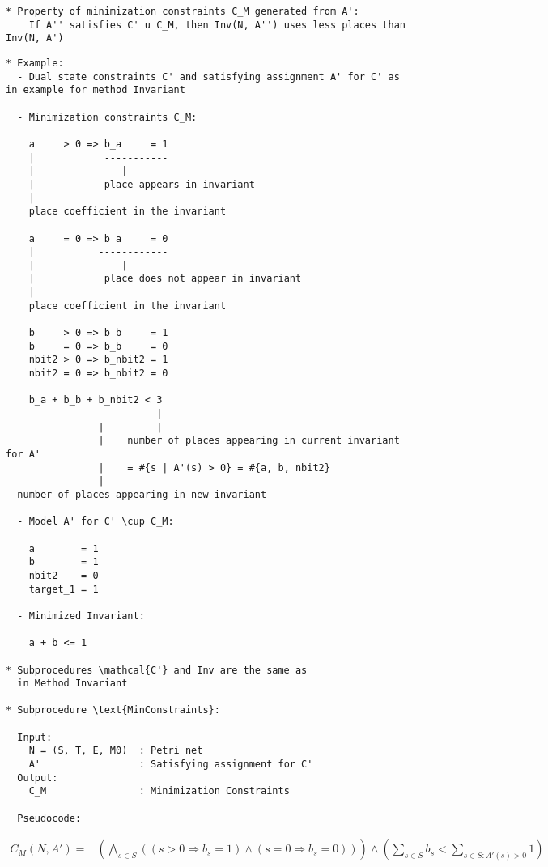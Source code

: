 \documentclass{llncs}
\begin{document}
\begin{verbatim}
* Property of minimization constraints C_M generated from A': 
    If A'' satisfies C' u C_M, then Inv(N, A'') uses less places than Inv(N, A')
\end{verbatim}

\newpage
\begin{verbatim}
* Example:
  - Dual state constraints C' and satisfying assignment A' for C' as in example for method Invariant

  - Minimization constraints C_M:

    a     > 0 => b_a     = 1
    |            -----------
    |               |
    |            place appears in invariant
    |
    place coefficient in the invariant

    a     = 0 => b_a     = 0
    |           ------------
    |               |
    |            place does not appear in invariant
    |
    place coefficient in the invariant

    b     > 0 => b_b     = 1
    b     = 0 => b_b     = 0
    nbit2 > 0 => b_nbit2 = 1
    nbit2 = 0 => b_nbit2 = 0

    b_a + b_b + b_nbit2 < 3
    -------------------   |
                |         |
                |    number of places appearing in current invariant for A'
                |    = #{s | A'(s) > 0} = #{a, b, nbit2}
                |
  number of places appearing in new invariant
  
  - Model A' for C' \cup C_M:

    a        = 1
    b        = 1
    nbit2    = 0
    target_1 = 1
    
  - Minimized Invariant:

    a + b <= 1
    
* Subprocedures \mathcal{C'} and Inv are the same as
  in Method Invariant

* Subprocedure \text{MinConstraints}:

  Input:
    N = (S, T, E, M0)  : Petri net
    A'                 : Satisfying assignment for C'
  Output:
    C_M                : Minimization Constraints

  Pseudocode:

\end{verbatim}

\begin{align*}
  C_M(N, A') =& \left( \bigwedge_{s \in S} \left(
      (s > 0 \Rightarrow b_s = 1) \land (s = 0 \Rightarrow b_s = 0)
    \right) \right) \land
    \left( \sum_{s \in S} b_s < \sum_{s \in S : A'(s) > 0} 1 \right)
\end{align*}
\end{document}
